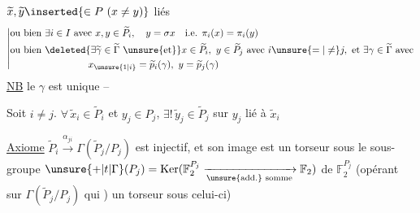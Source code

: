 \(\widetilde x,\widetilde y\inserted{\in P\ (x\ne y)}\) liés 
\[
 \left|\begin{aligned}
 &\text{ou bien }\exists i\in I\text{ avec }x,y\in\widetilde P_i,\quad y=\sigma x\quad\text{i.e. }\pi_i(x)=\pi_i(y)\\
 &\text{ou bien }\deleted{\exists\widetilde \gamma\in\widetilde \Gamma\ \unsure{\text{et}}}
 x\in\widetilde P_i,\ y\in\widetilde P_j\text{ avec }i\unsure{=|\ne} j,\text{ et }\exists \gamma\in\widetilde \Gamma\text{ avec}\\
 &\hspace{8em}x_{\unsure{1|i}}=\widetilde p_i(\gamma),\ y=\widetilde p_j(\gamma)
 \end{aligned}\right.
\]
\uline{NB} le \(\gamma\) est unique -- 


Soit \(i\ne j\).  \(\forall\,\widetilde x_i\in\widetilde P_i\) et  \(y_j\in P_j\), \(\exists!\,\widetilde y_j\in\widetilde P_j\) sur \(y_j\) lié à \(\widetilde x_i\)

\uline{Axiome} \(\widetilde P_i\xrightarrow{\alpha_{ji}}\Gamma(\widetilde P_j/P_j)\) est injectif, et  son image est un torseur sous le sous-groupe \(\unsure{+|t|\Gamma}(P_j)=\operatorname{Ker}(\mathbb F_2^{P_j}\xrightarrow[\text{\unsure{add.} somme}]{}\mathbb F_2)\) de \(\mathbb F_2^{P_j}\) (opérant sur \(\Gamma(\widetilde P_j/P_j)\) qui ) un torseur  sous celui-ci)

